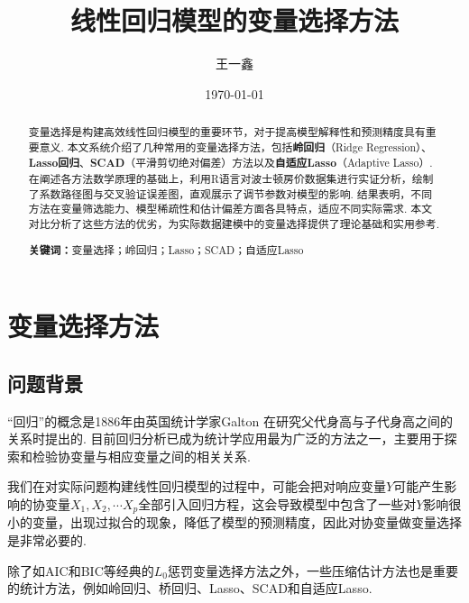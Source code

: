 \documentclass[12pt, a4paper, oneside]{ctexart}
\title{\textbf{线性回归模型的变量选择方法}}
\author{王一鑫}
\date{\today}
\begin{document}
	
	\maketitle
	
	\setcounter{page}{0}
	\maketitle
	\thispagestyle{empty}
	
	\begin{abstract} 
		变量选择是构建高效线性回归模型的重要环节，对于提高模型解释性和预测精度具有重要意义. 本文系统介绍了几种常用的变量选择方法，包括\textbf{岭回归}（Ridge Regression）、\textbf{Lasso回归}、\textbf{SCAD}（平滑剪切绝对偏差）方法以及\textbf{自适应Lasso}（Adaptive Lasso）. 在阐述各方法数学原理的基础上，利用R语言对波士顿房价数据集进行实证分析，绘制了系数路径图与交叉验证误差图，直观展示了调节参数对模型的影响. 结果表明，不同方法在变量筛选能力、模型稀疏性和估计偏差方面各具特点，适应不同实际需求. 本文对比分析了这些方法的优劣，为实际数据建模中的变量选择提供了理论基础和实用参考.
		
		\par\textbf{关键词：}变量选择；岭回归；Lasso；SCAD；自适应Lasso \end{abstract}
	
	\newpage
	\setcounter{page}{1}
	\tableofcontents
	\newpage
	\setcounter{page}{1}
	
	\section{变量选择方法}
	
	\subsection{问题背景}
	
	“回归”的概念是1886年由英国统计学家Galton 在研究父代身高与子代身高之间的关系时提出的. 目前回归分析已成为统计学应用最为广泛的方法之一，主要用于探索和检验协变量与相应变量之间的相关关系.
	
	我们在对实际问题构建线性回归模型的过程中，可能会把对响应变量$Y$可能产生影响的协变量$X_{1}, X_{2}, \cdots X_{p}$全部引入回归方程，这会导致模型中包含了一些对$Y$影响很小的变量，出现过拟合的现象，降低了模型的预测精度，因此对协变量做变量选择是非常必要的.
	
	除了如AIC和BIC等经典的$L_{0}$惩罚变量选择方法之外，一些压缩估计方法也是重要的统计方法，例如岭回归、桥回归、Lasso、SCAD和自适应Lasso.
	
\end{document}
